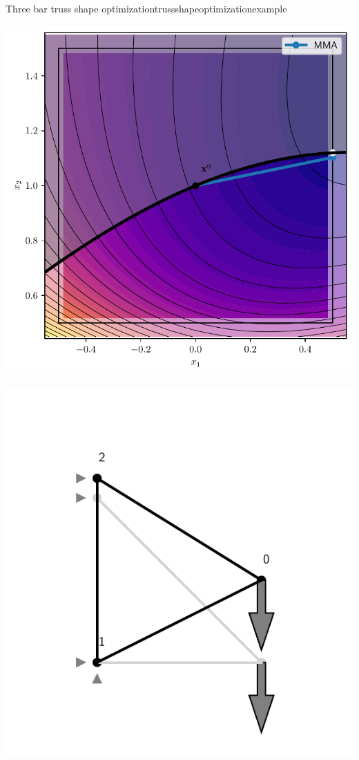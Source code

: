 \begin{example}{Three bar truss shape optimization}{trussshapeoptimizationexample}
    \begin{minipage}{.5\textwidth}
        \centering
        \includegraphics[width=0.9\linewidth]{figures/three_bar_truss_shape_optimization.pdf}
    \end{minipage}%
    \begin{minipage}{.5\textwidth}
        \centering
        \includegraphics[width=0.9\linewidth]{figures/three_bar_truss_shape_optimized.pdf}
    \end{minipage}
       
\end{example}


 





